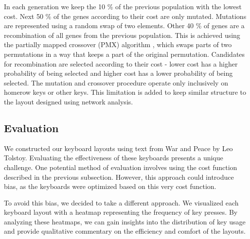 \documentclass[9pt,twocolumn,twoside]{pnas-report}
\begin{document}
{In each generation we keep the 10 \% of the previous population with the lowest cost.
Next 50 \% of the genes according to their cost are only mutated.
Mutations are represented using a random swap of two elements.
Other 40 \% of genes are a recombination of all genes from the previous population.
This is achieved using the partially mapped crossover (PMX) algorithm \cite{goldberg2014alleles}, which swaps parts of two permutations in a way that keeps a part of the original permutation.
Candidates for recombination are selected according to their cost - lower cost has a higher probability of being selected and higher cost has a lower probability of being selected.
The mutation and crossover procedure operate only inclusively on homerow keys or other keys.
This limitation is added to keep similar structure to the layout designed using network analysis.

\subsection*{Evaluation}

We constructed our keyboard layouts using text from War and Peace by Leo Tolstoy.
Evaluating the effectiveness of these keyboards presents a unique challenge.
One potential method of evaluation involves using the cost function described in the previous subsection.
However, this approach could introduce bias, as the keyboards were optimized based on this very cost function.

To avoid this bias, we decided to take a different approach.
We visualized each keyboard layout with a heatmap representing the frequency of key presses.
By analyzing these heatmaps, we can gain insights into the distribution of key usage and provide qualitative commentary on the efficiency and comfort of the layouts.

}




\end{document}
